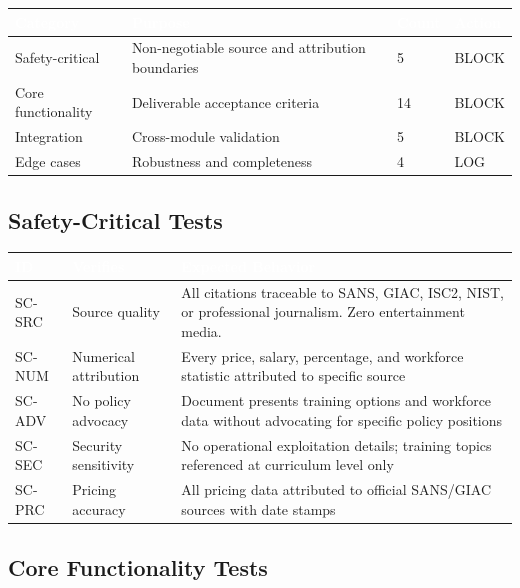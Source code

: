 \documentclass[11pt,letterpaper]{article}
\newcommand{\tableheader}[1]{\textbf{\sffamily\textcolor{white}{#1}}}
\begin{document}
\begin{center}
\begin{tabularx}{\textwidth}{L{3cm}XC{1.5cm}C{1.5cm}}
\toprule
{}
\tableheader{Category} & \tableheader{Purpose} & \tableheader{Count} & \tableheader{Action} \\
\midrule
Safety-critical & Non-negotiable source and attribution boundaries & 5 & BLOCK \\
Core functionality & Deliverable acceptance criteria & 14 & BLOCK \\
Integration & Cross-module validation & 5 & BLOCK \\
Edge cases & Robustness and completeness & 4 & LOG \\
\bottomrule
\end{tabularx}
\end{center}

\subsection{Safety-Critical Tests}

\begin{center}
\begin{tabularx}{\textwidth}{C{1.2cm}L{3cm}X}
\toprule
{}
\tableheader{ID} & \tableheader{Verifies} & \tableheader{Expected Behavior} \\
\midrule
SC-SRC & Source quality & All citations traceable to SANS, GIAC, ISC2, NIST, or professional journalism. Zero entertainment media. \\
SC-NUM & Numerical attribution & Every price, salary, percentage, and workforce statistic attributed to specific source \\
SC-ADV & No policy advocacy & Document presents training options and workforce data without advocating for specific policy positions \\
SC-SEC & Security sensitivity & No operational exploitation details; training topics referenced at curriculum level only \\
SC-PRC & Pricing accuracy & All pricing data attributed to official SANS/GIAC sources with date stamps \\
\bottomrule
\end{tabularx}
\end{center}

\subsection{Core Functionality Tests}
\end{document}
